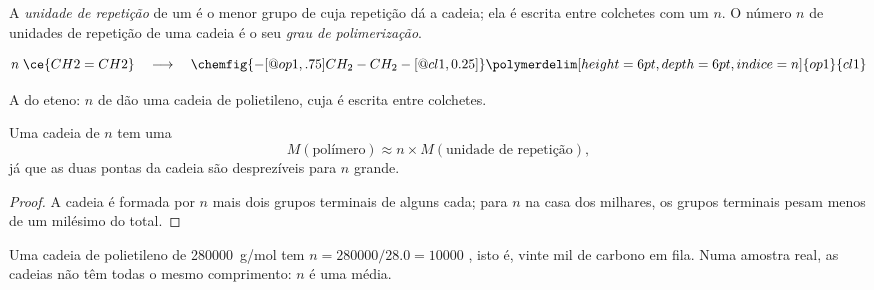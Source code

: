\begin{definition}\label{def:g12:polymers:repeat-unit}
A \emph{unidade de repetição} de um 
é o menor grupo de  cuja repetição dá a cadeia; ela é escrita
entre colchetes com um  $n$. O número $n$ de unidades de repetição
de uma cadeia é o seu \emph{grau de
polimerização}.
\end{definition}
\begin{omfigure}
\[
  n\;\ce{CH2=CH2}
  \quad\longrightarrow\quad
  \chemfig{-[@{op1,.75}]CH_2-CH_2-[@{cl1,0.25}]}
  \polymerdelim[height=6pt, depth=6pt, indice=n]{op1}{cl1}
\]

{\small A  do eteno: $n$  de  dão uma
cadeia de polietileno, cuja   é
escrita entre colchetes.}
\end{omfigure}

\begin{proposition}\label{prop:g12:polymers:molar-mass}
Uma cadeia de  $n$ tem uma 
\[
  M(\text{polímero}) \approx n \times M(\text{unidade de repetição}) ,
\]
já que as duas pontas da cadeia são desprezíveis para $n$ grande.
\end{proposition}

\begin{proof}
A cadeia é formada por $n$  mais dois grupos
terminais de alguns  cada; para $n$ na casa dos milhares, os
grupos terminais pesam menos de um milésimo do total.
\end{proof}

\begin{example}\label{ex:g12:polymers:pe}
Uma cadeia de polietileno de  \qty{280000}{g/mol} tem
$n = 280000/28.0 = 10000$ , isto é, vinte mil
 de carbono em fila. Numa amostra real, as cadeias não têm todas o
mesmo comprimento: $n$ é uma média.
\end{example}

